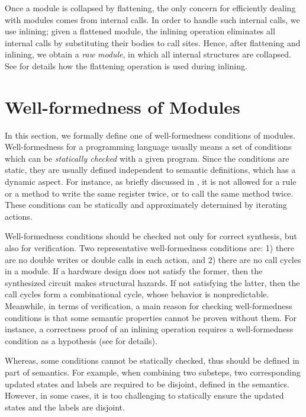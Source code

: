 Once a module is collapsed by flattening, the only concern for
efficiently dealing with modules comes from internal calls. In order
to handle such internal calls, we use inlining; given a flattened
module, the inlining operation eliminates all internal calls by
substituting their bodies to call sites. Hence, after flattening and
inlining, we obtain a \emph{raw module}, in which all internal
structures are collapsed. See  for details how
the flattening operation is used during inlining.

\section{Well-formedness of Modules}
\label{sec-wf}

In this section, we formally define one of well-formedness conditions
of modules. Well-formedness for a programming language usually means a
set of conditions which can be \emph{statically checked} with a given
program. Since the conditions are static, they are usually defined
independent to semantic definitions, which has a dynamic aspect.  For
instance, as briefly discussed in , it
is not allowed for a rule or a method to write the same register
twice, or to call the same method twice. These conditions can be
statically and approximately determined by iterating actions.

Well-formedness conditions should be checked not only for correct
synthesis, but also for verification. Two representative
well-formedness conditions are: 1) there are no double writes or
double calls in each action, and 2) there are no call cycles in a
module. If a hardware design does not satisfy the former, then the
synthesized circuit makes structural hazards. If not satisfying the
latter, then the call cycles form a combinational cycle, whose
behavior is nonpredictable. Meanwhile, in terms of verification, a
main reason for checking well-formedness conditions is that some
semantic properties cannot be proven without them. For instance, a
correctness proof of an inlining operation requires a well-formedness
condition as a hypothesis (see  for
details).

Whereas, some conditions cannot be statically checked, thus should be
defined in part of semantics. For example, when combining two
substeps, two corresponding updated states and labels are required to
be disjoint, defined in the \Substeps{} semantics. However, in some
cases, it is too challenging to statically ensure the updated states
and the labels are disjoint.

